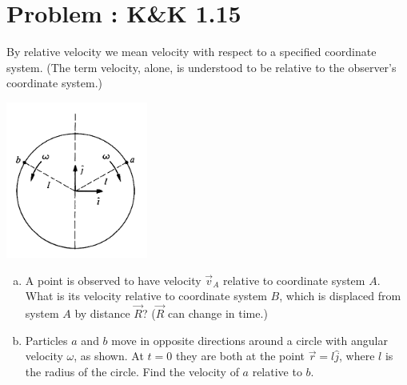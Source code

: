 \documentclass[problems]{esg8012pset}
\begin{document}
\section{Problem \thesection: K\&K 1.15}
  By relative velocity we mean velocity with respect to a specified coordinate system. (The term
  velocity, alone, is understood to be relative to the observer's coordinate system.)
  \begin{center}\includegraphics[width=0.35\textwidth]{ps01_2}\end{center}
  \begin{enumerate}[a.]
    \item A point is observed to have velocity $\vec v_A$ relative to coordinate system $A$. What is its
  velocity relative to coordinate system $B$, which is displaced from system $A$ by distance $\vec R$? ($\vec R$ can change in time.)
    \item Particles $a$ and $b$ move in opposite directions around a circle with angular velocity $\omega$,
  as shown. At $t = 0$ they are both at the point $\vec r = l\hat j$, where $l$ is the radius of the circle.
  Find the velocity of $a$ relative to $b$.
  \end{enumerate}
\end{document}
